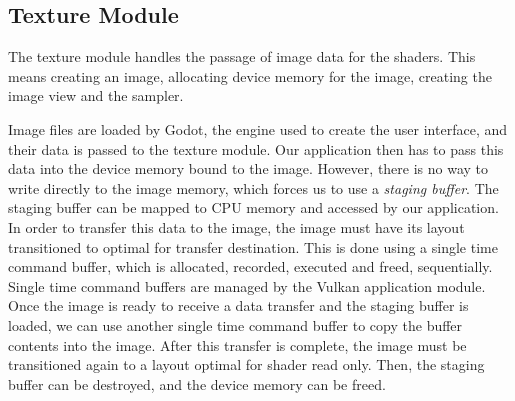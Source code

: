 \subsection{Texture Module}
The texture module handles the passage of image data for the shaders. This means creating an image, allocating device memory for the image, creating the image view and the sampler.

Image files are loaded by Godot, the engine used to create the user interface, and their data is passed to the texture module. Our application then has to pass this data into the device memory bound to the image. However, there is no way to write directly to the image memory, which forces us to use a \textit{staging buffer}. The staging buffer can be mapped to CPU memory and accessed by our application. In order to transfer this data to the image, the image must have its layout transitioned to optimal for transfer destination. This is done using a single time command buffer, which is allocated, recorded, executed and freed, sequentially. Single time command buffers are managed by the Vulkan application module. Once the image is ready to receive a data transfer and the staging buffer is loaded, we can use another single time command buffer to copy the buffer contents into the image. After this transfer is complete, the image must be transitioned again to a layout optimal for shader read only. Then, the staging buffer can be destroyed, and the device memory can be freed.
